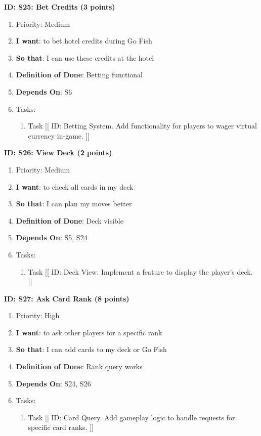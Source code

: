 \textbf{ID: S25: Bet Credits (3 points)}
\begin{enumerate}
    \item Priority: Medium
    \item \textbf{I want}: to bet hotel credits during Go Fish
    \item \textbf{So that}: I can use these credits at the hotel
    \item \textbf{Definition of Done}: Betting functional
    \item \textbf{Depends On}: S6
    \item Tasks:
    \begin{enumerate}
        \item Task [[ ID: Betting System. Add functionality for players to wager virtual currency in-game. ]]
    \end{enumerate}
\end{enumerate}

\textbf{ID: S26: View Deck (2 points)}
\begin{enumerate}
    \item Priority: Medium
    \item \textbf{I want}: to check all cards in my deck
    \item \textbf{So that}: I can plan my moves better
    \item \textbf{Definition of Done}: Deck visible
    \item \textbf{Depends On}: S5, S24
    \item Tasks:
    \begin{enumerate}
        \item Task [[ ID: Deck View. Implement a feature to display the player’s deck. ]]
    \end{enumerate}
\end{enumerate}

\textbf{ID: S27: Ask Card Rank (8 points)}
\begin{enumerate}
    \item Priority: High
    \item \textbf{I want}: to ask other players for a specific rank
    \item \textbf{So that}: I can add cards to my deck or Go Fish
    \item \textbf{Definition of Done}: Rank query works
    \item \textbf{Depends On}: S24, S26
    \item Tasks:
    \begin{enumerate}
        \item Task [[ ID: Card Query. Add gameplay logic to handle requests for specific card ranks. ]]
    \end{enumerate}
\end{enumerate}

